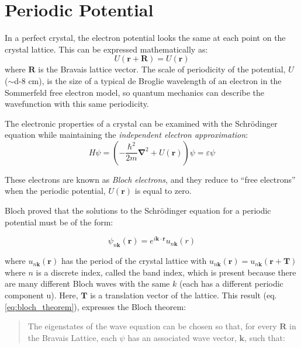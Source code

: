 \section{Periodic Potential}


	In a perfect crystal, the electron potential looks the same at each point on the crystal lattice. This can be expressed mathematically as:
	\begin{equation} \label{eq:U_period}
		U(\mathbf{r} + \mathbf{R}) = U(\mathbf{r})
	\end{equation}
	where $\mathbf{R}$ is the Bravais lattice vector. The scale of periodicity of the potential, $U$ ($\sim$\num{d-8} cm), is the size of a typical de Broglie wavelength of an electron in the Sommerfeld free electron model, so quantum mechanics can describe the wavefunction with this same periodicity. 

	The electronic properties of a crystal can be examined with the Schrödinger equation while maintaining the \textit{independent electron approximation}:
	\begin{equation} \label{eq:schrod}
		H\psi=\left(-\frac{\hbar^2}{2m}\boldsymbol{\nabla}^2 + U(\mathbf{r})\right)\psi = \varepsilon\psi
	\end{equation}

	These electrons are known as \textit{Bloch electrons}, and they reduce to ``free electrons'' when the periodic potential, $U(\mathbf{r})$ is equal to zero.

	Bloch proved that the solutions to the Schrödinger equation for a periodic potential must be of the form:

	\begin{equation} \label{eq:bloch_theorem}
		\psi_{n\mathbf{k}}(\mathbf{r}) 
		= e^{i\mathbf{k} \cdot \mathbf{r}}
		u_{n\mathbf{k}}(r)
	\end{equation}

	where $u_{n\mathbf{k}}(\mathbf{r})$ has the period of the crystal lattice with $u_{n\mathbf{k}}(\mathbf{r}) = u_{n\mathbf{k}}(\mathbf{r} + \mathbf{T})$
	where $n$ is a discrete index, called the band index, which is present because there are many different Bloch waves with the same $k$ (each has a different periodic component u).
	Here, $\mathbf{T}$ is a translation vector of the lattice. This result (eq. \ref{eq:bloch_theorem}), expresses the Bloch theorem:
	\begin{quotation}
		The eigenstates of the wave equation can be chosen so that, for every $\mathbf{R}$ in the Bravais Lattice, each $\psi$ has an associated wave vector, $\mathbf{k}$, such that:
	\end{quotation}

